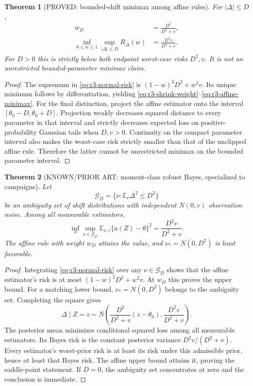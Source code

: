 \documentclass[11pt]{article}
\newcommand{\E}{\mathbb E}
\newtheorem{theorem}{Theorem}[section]
\theoremstyle{definition}
\theoremstyle{remark}
\begin{document}
\begin{theorem}[PROVED: bounded-shift minimax among affine rules]
For $|\Delta|\leq D$,
\begin{align}
 w_D&=\frac{D^2}{D^2+v},\label{eq:r3-shrink-weight}\\
 \inf_{0\leq w\leq1}\sup_{|\Delta|\leq D}R_\Delta(w)
 &=\frac{D^2v}{D^2+v}.\label{eq:r3-affine-minimax}
\end{align}
For $D>0$ this is strictly below both endpoint worst-case risks $D^2,v$.
It is not an unrestricted bounded-parameter minimax claim.
\end{theorem}
\begin{proof}
The supremum in \eqref{eq:r3-normal-risk} is
$(1-w)^2D^2+w^2v$.  Its unique minimum follows by differentiation, yielding
\eqref{eq:r3-shrink-weight}--\eqref{eq:r3-affine-minimax}.
For the final distinction, project the affine estimator onto the interval
$[\theta_0-D,\theta_0+D]$.  Projection weakly decreases squared distance to
every parameter in that interval and strictly decreases expected loss
on positive-probability Gaussian tails when $D,v>0$.  Continuity on the
compact parameter interval also makes the worst-case risk strictly
smaller than that of the unclipped affine rule.  Therefore the latter
cannot be unrestricted minimax on the bounded parameter interval.
\end{proof}

\begin{theorem}[KNOWN/PRIOR ART: moment-class robust Bayes, specialized to campaigns]
Let
\[
 \mathcal G_D=\{\nu:\E_\nu\Delta^2\leq D^2\}
\]
be an ambiguity set of shift distributions with independent
$N(0,v)$ observation noise.  Among all measurable estimators,
\begin{equation}
 \inf_a\sup_{\nu\in\mathcal G_D}
 \E_{\nu,\varepsilon}\{a(Z)-\theta\}^2
 =\frac{D^2v}{D^2+v}.
 \label{eq:r3-moment-minimax}
\end{equation}
The affine rule with weight $w_D$ attains the value, and
$\nu_*=N(0,D^2)$ is least favorable.
\end{theorem}
\begin{proof}
Integrating \eqref{eq:r3-normal-risk} over any $\nu\in\mathcal G_D$ shows
that the affine estimator's risk is at most
$(1-w)^2D^2+w^2v$.  At $w_D$ this proves the upper bound.
For a matching lower bound, $\nu_*=N(0,D^2)$ belongs to the ambiguity set.
Completing the square gives
\[
 \Delta\mid Z=z\sim N\left(
 \frac{D^2}{D^2+v}(z-\theta_0),\frac{D^2v}{D^2+v}\right).
\]
The posterior mean minimizes conditional squared loss among all
measurable estimators.  Its Bayes risk is the constant posterior variance
$D^2v/(D^2+v)$.  Every estimator's worst-prior risk is at least its risk
under this admissible prior, hence at least that Bayes risk.  The affine
upper bound attains it, proving the saddle-point statement.  If $D=0$,
the ambiguity set concentrates at zero and the conclusion is immediate.
\end{proof}
\end{document}
